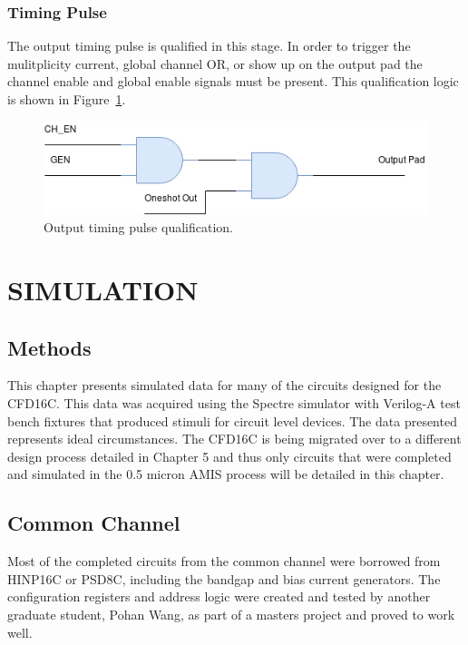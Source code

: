 \documentclass[12pt,oneside,final]{siuethesis}
\theoremstyle{definition}
\begin{document}
\subsection{Timing Pulse}
\par The output timing pulse is qualified in this stage. In order to trigger the mulitplicity current, global channel OR, or show up on the output pad the channel enable and global enable signals must be present. This qualification logic is shown in Figure~\ref{fig:output}.
\begin{figure}[htbp!]
\centering
\includegraphics[scale=.55,keepaspectratio=true]{images/output.png} 
\caption{Output timing pulse qualification.}
\label{fig:output}
\end{figure}

\chapter{SIMULATION}
\section{Methods}
\par This chapter presents simulated data for many of the circuits designed for the CFD16C. This data was acquired using the Spectre simulator with Verilog-A test bench fixtures that produced stimuli for circuit level devices. The data presented represents ideal circumstances. The CFD16C is being migrated over to a different design process detailed in Chapter 5 and thus only circuits that were completed and simulated in the 0.5 micron AMIS process will be detailed in this chapter.

\section{Common Channel}
\par Most of the completed circuits from the common channel were borrowed from HINP16C or PSD8C, including the bandgap and bias current generators. The configuration registers and address logic were created and tested by another graduate student, Pohan Wang, as part of a masters project and proved to work well. 
\end{document}
